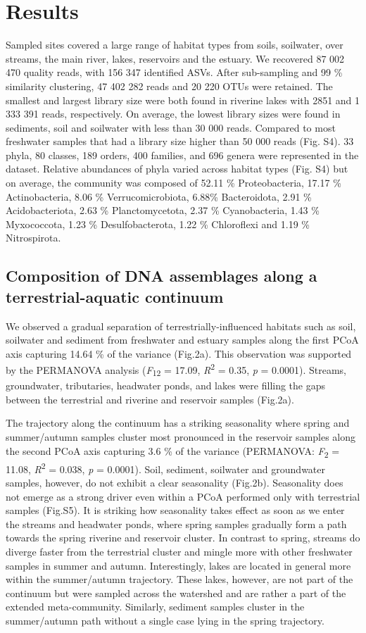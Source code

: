 \documentclass[12pt,a4paper]{article} %
\begin{document}
\section*{Results}
Sampled sites covered a large range of habitat types from soils, soilwater, over streams, the main river, lakes, reservoirs and the estuary. We recovered 87 002 470 quality reads, with 156 347 identified ASVs. After sub-sampling and 99 \% similarity clustering, 47 402 282 reads and 20 220 OTUs were retained. The smallest and largest library size were both found in riverine lakes with 2851 and 1 333 391 reads, respectively. On average, the lowest library sizes were found in sediments, soil and soilwater with less than 30 000 reads. Compared to most freshwater samples that had a library size higher than 50 000 reads (Fig. S4). 33 phyla, 80 classes,  189 orders, 400 families, and 696 genera were represented in the dataset. Relative abundances of phyla varied across habitat types (Fig. S4) but on average, the community was composed of 52.11 \% Proteobacteria, 17.17 \% Actinobacteria, 8.06 \% Verrucomicrobiota, 6.88\% Bacteroidota, 2.91 \% Acidobacteriota, 2.63 \% Planctomycetota, 2.37 \% Cyanobacteria, 1.43 \% Myxococcota, 1.23 \% Desulfobacterota, 1.22 \% Chloroflexi and 1.19 \% Nitrospirota.

\subsection*{Composition of DNA assemblages along a terrestrial-aquatic continuum}
We observed a gradual separation of terrestrially-influenced habitats such as soil, soilwater and sediment from freshwater and estuary samples along the first PCoA axis capturing 14.64 \% of the variance (Fig.2a). This observation was supported by the PERMANOVA analysis (\textit{F}\textsubscript{12} = 17.09, \textit{R}\textsuperscript{2} = 0.35, \textit{p} = 0.0001). Streams, groundwater, tributaries, headwater ponds, and lakes were filling the gaps between the terrestrial and riverine and reservoir samples (Fig.2a). 

The trajectory along the continuum has a striking seasonality where spring and summer/autumn samples cluster most pronounced in the reservoir samples along the second PCoA axis capturing 3.6 \% of the variance (PERMANOVA: \textit{F}\textsubscript{2} = 11.08, \textit{R}\textsuperscript{2} = 0.038, \textit{p} = 0.0001). Soil, sediment, soilwater and groundwater samples, however, do not exhibit a clear seasonality (Fig.2b). Seasonality does not emerge as a strong driver even within a PCoA performed only with terrestrial samples (Fig.S5). It is striking how seasonality takes effect as soon as we enter the streams and headwater ponds, where spring samples gradually form a path towards the spring riverine and reservoir cluster. In contrast to spring, streams do diverge faster from the terrestrial cluster and mingle more with other freshwater samples in summer and autumn. Interestingly, lakes are located in general more within the summer/autumn trajectory. These lakes, however, are not part of the continuum but were sampled across the watershed and are rather a part of the extended meta-community. Similarly, sediment samples cluster in the summer/autumn path without a single case lying in the spring trajectory.
\end{document}
